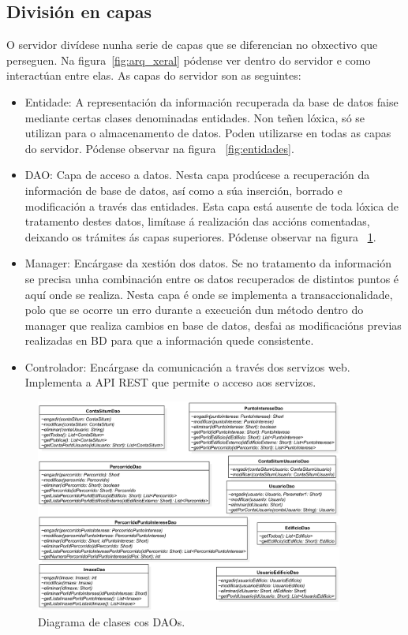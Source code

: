 \subsection{División en capas}
O servidor divídese nunha serie de capas que se diferencian no obxectivo que perseguen. Na figura~\ref{fig:arq_xeral} pódense ver dentro do servidor e como interactúan entre elas. As capas do servidor son as seguintes:

\begin{itemize}
	\item Entidade: A representación da información recuperada da base de datos faise mediante certas clases denominadas entidades. Non teñen lóxica, só se utilizan para o almacenamento de datos. Poden utilizarse en todas as capas do servidor. Pódense observar na figura ~\ref{fig:entidades}.
	\item DAO: Capa de acceso a datos. Nesta capa prodúcese a recuperación da información de base de datos, así como a súa inserción, borrado e modificación a través das entidades. Esta capa está ausente de toda lóxica de tratamento destes datos, limítase á realización das accións comentadas, deixando os trámites ás capas superiores. Pódense observar na figura ~\ref{fig:daos}.
	\item Manager: Encárgase da xestión dos datos. Se no tratamento da información se precisa unha combinación entre os datos recuperados de distintos puntos é aquí onde se realiza. Nesta capa é onde se implementa a transaccionalidade, polo que se ocorre un erro durante a execución dun método dentro do manager que realiza cambios en base de datos, desfai as modificacións previas realizadas en BD para que a información quede consistente.
	\item Controlador: Encárgase da comunicación a través dos servizos web. Implementa a API REST que permite o acceso aos servizos.
\end{itemize}



\begin{figure}[tbh] 
	\begin{center}
		\includegraphics[width=0.90\textwidth]{figures/BD/daos}
		\caption{Diagrama de clases cos DAOs.}
		\label{fig:daos}
	\end{center}
\end{figure}


